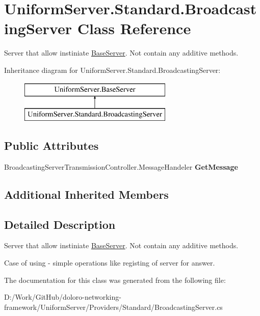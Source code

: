 \hypertarget{class_uniform_server_1_1_standard_1_1_broadcasting_server}{}\section{Uniform\+Server.\+Standard.\+Broadcasting\+Server Class Reference}
\label{class_uniform_server_1_1_standard_1_1_broadcasting_server}


Server that allow instiniate \mbox{\hyperlink{class_uniform_server_1_1_base_server}{Base\+Server}}. Not contain any additive methods.  


Inheritance diagram for Uniform\+Server.\+Standard.\+Broadcasting\+Server\+:\begin{figure}[H]
\begin{center}
\leavevmode
\includegraphics[height=2.000000cm]{d5/dac/class_uniform_server_1_1_standard_1_1_broadcasting_server}
\end{center}
\end{figure}
\subsection*{Public Attributes}
\begin{DoxyCompactItemize}
\item 
\mbox{\label{class_uniform_server_1_1_standard_1_1_broadcasting_server_a0c09cadabd5e8c941979bc7b32185c79}} 
Broadcasting\+Server\+Transmission\+Controller.\+Message\+Handeler {\bfseries Get\+Message}
\end{DoxyCompactItemize}
\subsection*{Additional Inherited Members}


\subsection{Detailed Description}
Server that allow instiniate \mbox{\hyperlink{class_uniform_server_1_1_base_server}{Base\+Server}}. Not contain any additive methods. 

Case of using -\/ simple operations like registing of server for answer. 

The documentation for this class was generated from the following file\+:\begin{DoxyCompactItemize}
\item 
D\+:/\+Work/\+Git\+Hub/doloro-\/networking-\/framework/\+Uniform\+Server/\+Providers/\+Standard/Broadcasting\+Server.\+cs\end{DoxyCompactItemize}
